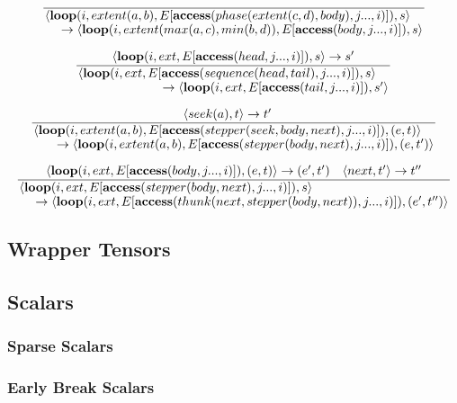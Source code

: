 \[
\frac{}
{\splitfrac{\langle \finchloop(i, extent(a, b), E[\finchaccess(phase(extent(c, d), body), j..., i)]), s\rangle
    }{\rightarrow \langle \finchloop(i, extent(max(a, c), min(b, d)), E[\finchaccess(body, j..., i)]), s\rangle}}
\]

\[
\frac{\langle \finchloop(i, ext, E[\finchaccess(head, j..., i)]), s\rangle \rightarrow s'}
{\splitfrac{\langle \finchloop(i, ext, E[\finchaccess(sequence(head, tail), j..., i)]), s\rangle
    }{\rightarrow \langle \finchloop(i, ext, E[\finchaccess(tail, j..., i)]), s'\rangle}}
\]

\[
\frac{\langle seek(a), t \rangle \rightarrow t' \quad }
{\splitfrac{\langle \finchloop(i, extent(a, b), E[\finchaccess(stepper(seek, body, next), j..., i)]), (e, t)\rangle
    }{\rightarrow \langle \finchloop(i, extent(a, b), E[\finchaccess(stepper(body, next), j..., i)]), (e, t')\rangle}}
\]

\[
\frac{\langle \finchloop(i, ext, E[\finchaccess(body, j..., i)]), (e, t) \rangle \rightarrow (e', t') \quad \langle next, t' \rangle \rightarrow t''}
{\splitfrac{\langle \finchloop(i, ext, E[\finchaccess(stepper(body, next), j..., i)]), s\rangle
    }{\rightarrow \langle \finchloop(i, ext, E[\finchaccess(thunk(next, stepper(body, next)), j..., i)]), (e', t'')\rangle}}
\]


\subsection{Wrapper Tensors}

\subsection{Scalars}

\subsubsection{Sparse Scalars}
\subsubsection{Early Break Scalars}

